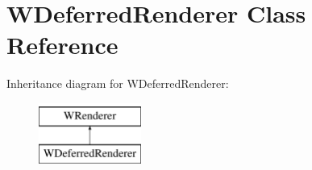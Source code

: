 \hypertarget{class_w_deferred_renderer}{}\section{W\+Deferred\+Renderer Class Reference}
\label{class_w_deferred_renderer}
Inheritance diagram for W\+Deferred\+Renderer\+:\begin{figure}[H]
\begin{center}
\leavevmode
\includegraphics[height=2.000000cm]{class_w_deferred_renderer}
\end{center}
\end{figure}
